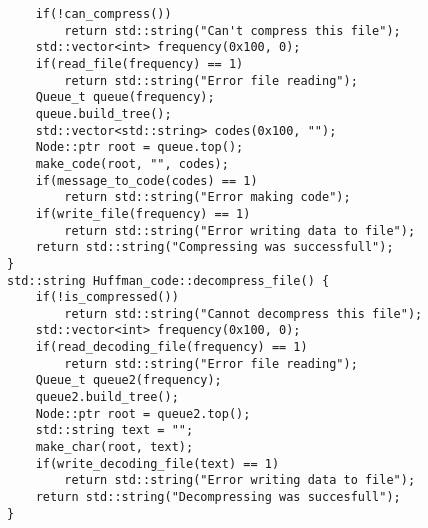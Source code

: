 \begin{verbatim}
    if(!can_compress())
        return std::string("Can't compress this file");
    std::vector<int> frequency(0x100, 0);
    if(read_file(frequency) == 1)
        return std::string("Error file reading");
    Queue_t queue(frequency);
    queue.build_tree();
    std::vector<std::string> codes(0x100, "");
    Node::ptr root = queue.top();
    make_code(root, "", codes);
    if(message_to_code(codes) == 1)
        return std::string("Error making code");
    if(write_file(frequency) == 1)
        return std::string("Error writing data to file");
    return std::string("Compressing was successfull");
}
std::string Huffman_code::decompress_file() {
    if(!is_compressed())
        return std::string("Cannot decompress this file");
    std::vector<int> frequency(0x100, 0);
    if(read_decoding_file(frequency) == 1)
        return std::string("Error file reading");
    Queue_t queue2(frequency);
    queue2.build_tree();
    Node::ptr root = queue2.top();
    std::string text = "";
    make_char(root, text);
    if(write_decoding_file(text) == 1)
        return std::string("Error writing data to file");
    return std::string("Decompressing was succesfull");
}
\end{verbatim}
